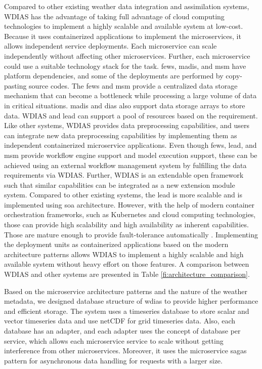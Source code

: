 Compared to other existing weather data integration and assimilation systems, WDIAS has the advantage of taking full advantage of cloud computing technologies to implement a highly scalable and available system at low-cost. Because it uses containerized applications to implement the microservices, it allows independent service deployments. Each microservice can scale independently without affecting other microservices. Further, each microservice could use a suitable technology stack for the task. \acrshort{fews}, \acrshort{madis}, and \acrshort{msm} have platform dependencies, and some of the deployments are performed by copy-pasting source codes. The \acrshort{fews} and \acrshort{msm} provide a centralized data storage mechanism that  can become a bottleneck while processing a large volume of data in critical situations. \acrshort{madis} and \acrshort{dias} also support data storage arrays to store data. WDIAS and \acrshort{lead} can support a pool of resources based on the requirement.
Like other systems, WDIAS provides data preprocessing capabilities, and users can integrate new data preprocessing capabilities by implementing them as independent containerized microservice applications. Even though \acrshort{fews}, \acrshort{lead}, and \acrshort{msm} provide workflow engine support and model execution support, these can be achieved using an external workflow management system by fulfilling the data requirements via WDIAS. Further, WDIAS is an extendable open framework such that similar capabilities can be integrated as a new extension module system. Compared to other existing systems, the \acrshort{lead} is more scalable and is implemented using \acrshort{soa} architecture. However, with the help of modern container orchestration frameworks, such as Kubernetes and cloud computing technologies, those can provide high scalability and high availability as inherent capabilities. Those are mature enough to provide fault-tolerance automatically \cite{Scolati2019ADevices}. Implementing the deployment units as containerized applications based on the modern architecture patterns allows WDIAS to implement a highly scalable and high available system without heavy effort on those features.  A comparison  between WDIAS and other systems are presented in Table \ref{fi:architecture_comparison}.

Based on the microservice architecture patterns and the nature of the weather metadata, we designed database structure of \acrshort{wdias} to provide higher performance and efficient storage. The system uses a timeseries database to store scalar and vector timeseries data and use netCDF for grid timeseries data. Also, each database has an adapter, and each adapter uses the concept of database per service, which allows each microservice service to scale without getting interference from other microservices.
Moreover, it uses the microservice sagas pattern for asynchronous data handling for requests with a larger size.


